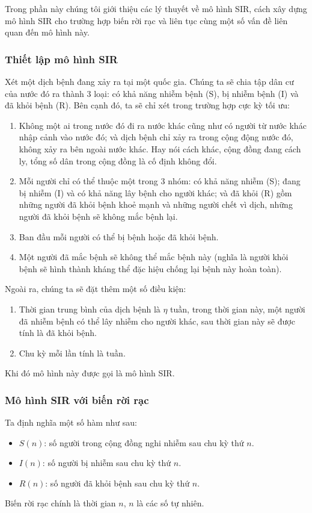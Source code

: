 \documentclass[a4paper]{article}
\begin{document}
Trong phần này chúng tôi giới thiệu các lý thuyết về mô hình SIR, cách xây dựng mô hình SIR cho trường hợp biến rời rạc và liên tục cùng một số vấn đề liên quan đến mô hình này. 
\subsubsection{Thiết lập mô hình SIR}

Xét một dịch bệnh đang xảy ra tại một quốc gia. Chúng ta sẽ chia tập dân cư của nước đó ra thành 3 loại: có khả năng nhiễm bệnh (S), bị nhiễm bệnh (I) và đã khỏi bệnh (R). Bên cạnh đó, ta sẽ chỉ xét trong trường hợp cực kỳ tối ưu:
\begin{enumerate}
    \item Không một ai trong nước đó đi ra nước khác cũng như có người từ nước khác nhập cảnh vào nước đó; và dịch bệnh chỉ xảy ra trong cộng động nước đó, không xảy ra bên ngoài nước khác. Hay nói cách khác, cộng đồng đang cách ly, tổng số dân trong cộng đồng là cố định không đổi.
    \item Mỗi người chỉ có thể thuộc một trong 3 nhóm: có khả năng nhiễm (S); đang bị nhiễm (I) và có khả năng lây bệnh cho người khác; và đã khỏi (R) gồm những người đã khỏi bệnh khoẻ mạnh và những người chết vì dịch, những người đã khỏi bệnh sẽ không mắc bệnh lại.
    \item Ban đầu mỗi người có thể bị bệnh hoặc đã khỏi bệnh.
    \item Một người đã mắc bệnh sẽ không thể mắc bệnh này (nghĩa là người khỏi bệnh sẽ hình thành kháng thể đặc hiệu chống lại bệnh này hoàn toàn).
\end{enumerate}

Ngoài ra, chúng ta sẽ đặt thêm một số điều kiện:
\begin{enumerate}
    \item Thời gian trung bình của dịch bệnh là $\eta$ tuần, trong thời gian này, một người đã nhiễm bệnh có thể lây nhiễm cho người khác, sau thời gian này sẽ được tính là đã khỏi bệnh. 
    \item Chu kỳ mỗi lần tính là tuần.
\end{enumerate}

Khi đó mô hình này được gọi là mô hình SIR.

\subsubsection{Mô hình SIR với biến rời rạc}
\label{sec: discrete SIR}

Ta định nghĩa một số hàm như sau:
\begin{itemize}
    \item $S(n)$: số người trong cộng đồng nghi nhiễm sau chu kỳ thứ $n$.
    \item $I(n)$: số người bị nhiễm sau chu kỳ thứ $n$.
    \item $R(n)$: số người đã khỏi bệnh sau chu kỳ thứ $n$.
\end{itemize}
Biến rời rạc chính là thời gian $n$, $n$ là các số tự nhiên.
\end{document}
